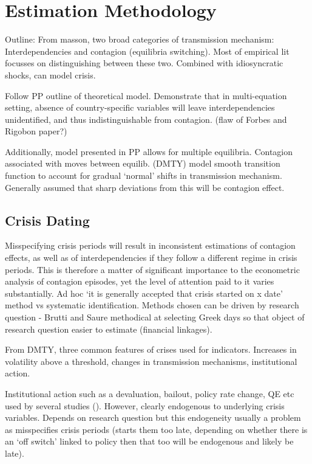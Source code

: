 \documentclass[../base.tex]{subfiles}
\begin{document}
\section{Estimation Methodology}
\label{est}

Outline:
From masson, two broad categories of transmission mechanism: Interdependencies and contagion (equilibria switching). Most of empirical lit focusses on distinguishing between these two. Combined with idiosyncratic shocks, can model crisis. 

Follow PP outline of theoretical model. Demonstrate that in multi-equation setting, absence of country-specific variables will leave interdependencies unidentified, and thus indistinguishable from contagion. (flaw of Forbes and Rigobon paper?) 

Additionally, model presented in PP allows for multiple equilibria. Contagion associated with moves between equilib. \cite{dungey2015endogenous} (DMTY) model smooth transition function to account for gradual `normal' shifts in transmission mechanism. Generally assumed that sharp deviations from this will be contagion effect. 


\subsection{Crisis Dating}

Misspecifying crisis periods will result in inconsistent estimations of contagion effects, as well as of interdependencies if they follow a different regime in crisis periods. This is therefore a matter of significant importance to the econometric analysis of contagion episodes, yet the level of attention paid to it varies substantially. Ad hoc `it is generally accepted that crisis started on x date' method vs systematic identification. Methods chosen can be driven by research question - Brutti and Saure methodical at selecting Greek days so that object of research question easier to estimate (financial linkages). 

From DMTY, three common features of crises used for indicators. Increases in volatility above a threshold, changes in transmission mechanisms, institutional action.

Institutional action such as a devaluation, bailout, policy rate change, QE etc used by several studies (). However, clearly endogenous to underlying crisis variables. Depends on research question but this endogeneity usually a problem as misspecifies crisis periods (starts them too late, depending on whether there is an `off switch' linked to policy then that too will be endogenous and likely be late). 
\end{document}
